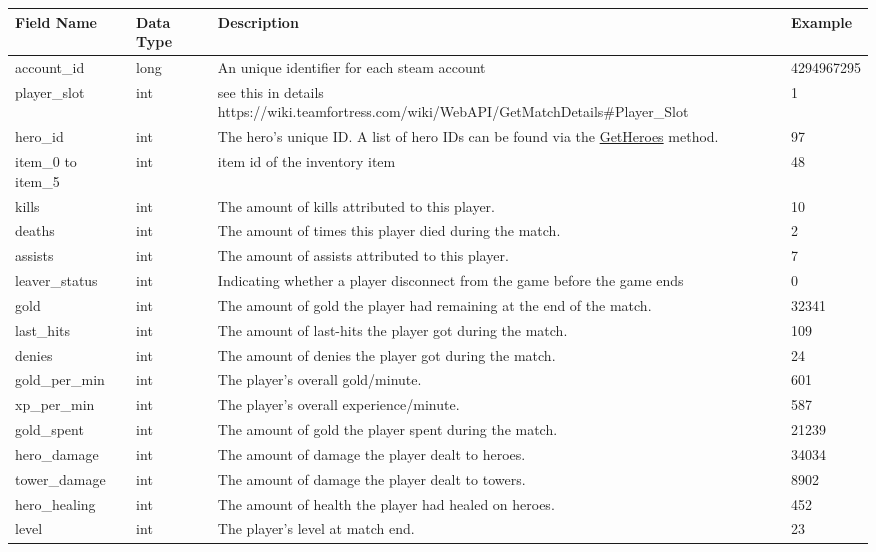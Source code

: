 \documentclass{article}
\begin{document}
\begin{tabular}{|p{3cm}|p{2cm}|p{5cm}|p{3cm}|}
\hline
Field Name& Data Type& Description & Example\\
\hline
account\_id & long & An unique identifier for each steam account & 4294967295 \\
\hline
player\_slot & int & see this in details https://wiki.teamfortress.com/wiki/WebAPI/GetMatchDetails\#Player\_Slot & 1 \\
\hline
hero\_id & int & The hero's unique ID. A list of hero IDs can be found via the \href{https://wiki.teamfortress.com/wiki/WebAPI/GetHeroes}{GetHeroes} method. & 97 \\
\hline
item_0 to item_5 & int & item id of the inventory item & 48 \\
\hline
kills & int & The amount of kills attributed to this player. & 10 \\
\hline
deaths & int & The amount of times this player died during the match. & 2 \\
\hline
assists & int & The amount of assists attributed to this player. & 7 \\
\hline
leaver\_status & int & Indicating whether a player disconnect from the game before the game ends & 0 \\
\hline
gold & int & The amount of gold the player had remaining at the end of the match. & 32341 \\
\hline
last\_hits & int & The amount of last-hits the player got during the match. & 109 \\
\hline
denies & int & The amount of denies the player got during the match. & 24 \\
\hline
gold\_per\_min & int &  The player's overall gold/minute. & 601 \\
\hline
xp\_per\_min & int & The player's overall experience/minute. & 587 \\
\hline
gold\_spent & int & The amount of gold the player spent during the match. & 21239 \\
\hline
hero\_damage & int & The amount of damage the player dealt to heroes. & 34034 \\
\hline
tower\_damage & int & The amount of damage the player dealt to towers. & 8902 \\
\hline
hero\_healing & int & The amount of health the player had healed on heroes. & 452 \\
\hline
level & int & The player's level at match end. & 23 \\
\hline
\end{tabular}
\end{document}
